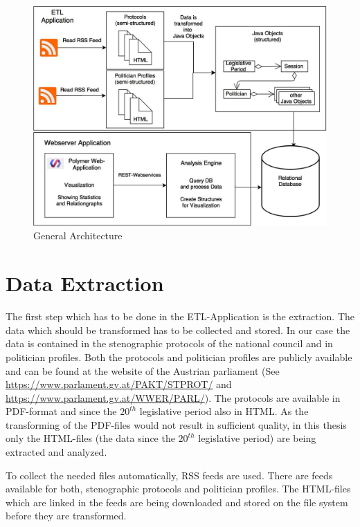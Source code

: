\begin{figure}
	\centering
	\includegraphics[width=\textwidth]{imgs/overall_architecture}
	\caption{General Architecture}
	\label{fig:general_architecture}
\end{figure}

\section{Data Extraction}
\label{sec:data_extraction_transforming}
The first step which has to be done in the ETL-Application is the extraction. The data which should be transformed has to be collected and stored. In our case the data is contained in the stenographic protocols of the national council and in politician profiles. Both the protocols and politician profiles are publicly available and can be found at the website of the Austrian parliament (See \url{https://www.parlament.gv.at/PAKT/STPROT/} and \url{https://www.parlament.gv.at/WWER/PARL/}). The protocols are available in PDF-format and since the $20^{th}$ legislative period also in HTML. As the transforming of the PDF-files would not result in sufficient quality, in this thesis only the HTML-files (the data since the $20^{th}$ legislative period) are being extracted and analyzed.

To collect the needed files automatically, RSS feeds are used. There are feeds available for both, stenographic protocols and politician profiles. The HTML-files which are linked in the feeds are being downloaded and stored on the file system before they are transformed.

